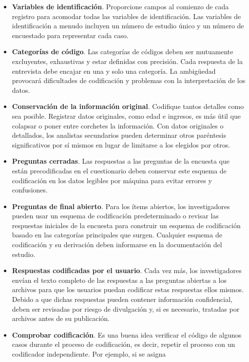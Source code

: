 \documentclass[
  spanish,
  a4paper,
  oneside]{scrbook}
\begin{document}
\begin{itemize}
\item
  \textbf{Variables de identificación}. Proporcione campos al comienzo
  de cada registro para acomodar todas las variables de identificación.
  Las variables de identificación a menudo incluyen un número de estudio
  único y un número de encuestado para representar cada caso.
\item
  \textbf{Categorías de código}. Las categorías de códigos deben ser
  mutuamente excluyentes, exhaustivas y estar definidas con precisión.
  Cada respuesta de la entrevista debe encajar en una y solo una
  categoría. La ambigüedad provocará dificultades de codificación y
  problemas con la interpretación de los datos.
\item
  \textbf{Conservación de la información original}. Codifique tantos
  detalles como sea posible. Registrar datos originales, como edad e
  ingresos, es más útil que colapsar o poner entre corchetes la
  información. Con datos originales o detallados, los analistas
  secundarios pueden determinar otros paréntesis significativos por sí
  mismos en lugar de limitarse a los elegidos por otros.
\item
  \textbf{Preguntas cerradas}. Las respuestas a las preguntas de la
  encuesta que están precodificadas en el cuestionario deben conservar
  este esquema de codificación en los datos legibles por máquina para
  evitar errores y confusiones.
\item
  \textbf{Preguntas de final abierto}. Para los ítems abiertos, los
  investigadores pueden usar un esquema de codificación predeterminado o
  revisar las respuestas iniciales de la encuesta para construir un
  esquema de codificación basado en las categorías principales que
  surgen. Cualquier esquema de codificación y su derivación deben
  informarse en la documentación del estudio.
\item
  \textbf{Respuestas codificadas por el usuario}. Cada vez más, los
  investigadores envían el texto completo de las respuestas a las
  preguntas abiertas a los archivos para que los usuarios puedan
  codificar estas respuestas ellos mismos. Debido a que dichas
  respuestas pueden contener información confidencial, deben ser
  revisadas por riesgo de divulgación y, si es necesario, tratadas por
  archivos antes de su publicación.
\item
  \textbf{Comprobar codificación}. Es una buena idea verificar el código
  de algunos casos durante el proceso de codificación, es decir, repetir
  el proceso con un codificador independiente. Por ejemplo, si se asigna

\end{itemize}
\end{document}

